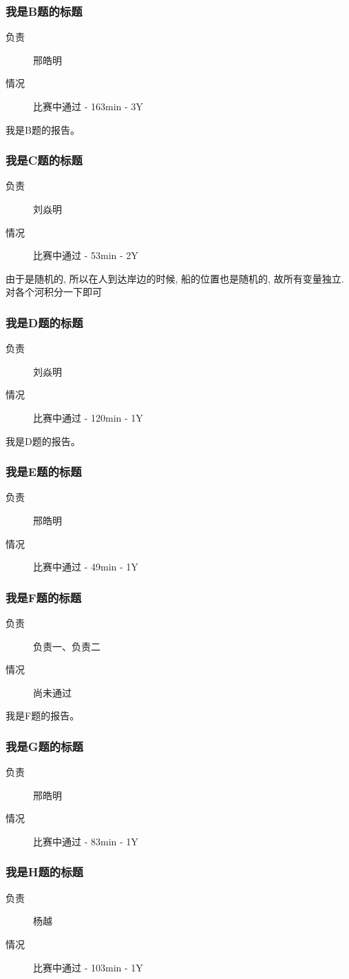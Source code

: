 \documentclass[a4paper, 11pt, nofonts, nocap, fancyhdr]{ctexart}
\newcommand{\problem}[1]{\subsubsection{#1}}
\begin{document}
\problem{我是B题的标题}

\begin{description}
\item[负责] 邢皓明
\item[情况] 比赛中通过 - 163min - 3Y
\end{description}

我是B题的报告。

\problem{我是C题的标题}

\begin{description}
\item[负责] 刘焱明
\item[情况] 比赛中通过 - 53min - 2Y
\end{description}

由于是随机的, 所以在人到达岸边的时候, 船的位置也是随机的, 故所有变量独立. 对各个河积分一下即可

\problem{我是D题的标题}

\begin{description}
\item[负责] 刘焱明
\item[情况] 比赛中通过 - 120min - 1Y
\end{description}

我是D题的报告。

\problem{我是E题的标题}

\begin{description}
\item[负责] 邢皓明
\item[情况] 比赛中通过 - 49min - 1Y
\end{description}


\problem{我是F题的标题}

\begin{description}
\item[负责] 负责一、负责二
\item[情况] 尚未通过
\end{description}

我是F题的报告。

\problem{我是G题的标题}

\begin{description}
\item[负责] 邢皓明
\item[情况] 比赛中通过 - 83min - 1Y
\end{description}


\problem{我是H题的标题}

\begin{description}
\item[负责] 杨越
\item[情况] 比赛中通过 - 103min - 1Y
\end{description}
\end{document}
